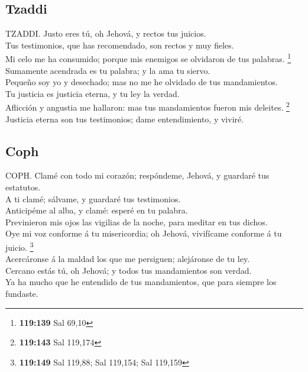 \hypertarget{tzaddi}{%
\subsection{Tzaddi}\label{tzaddi}}

 TZADDI. Justo eres tú, oh Jehová, y rectos tus
juicios.\\
 Tus testimonios, que has recomendado, son rectos y muy
fieles.\\
 Mi celo me ha consumido; porque mis enemigos se
olvidaron de tus palabras. \footnote{\textbf{119:139} Sal 69,10}\\
 Sumamente acendrada es tu palabra; y la ama tu
siervo.\\
 Pequeño soy yo y desechado; mas no me he olvidado de
tus mandamientos.\\
 Tu justicia es justicia eterna, y tu ley la verdad.\\
 Aflicción y angustia me hallaron: mas tus mandamientos
fueron mis deleites. \footnote{\textbf{119:143} Sal 119,174}\\
 Justicia eterna son tus testimonios; dame
entendimiento, y viviré.

\hypertarget{coph}{%
\subsection{Coph}\label{coph}}

 COPH. Clamé con todo mi corazón; respóndeme, Jehová, y
guardaré tus estatutos.\\
 A ti clamé; sálvame, y guardaré tus testimonios.\\
 Anticipéme al alba, y clamé: esperé en tu palabra.\\
 Previnieron mis ojos las vigilias de la noche, para
meditar en tus dichos.\\
 Oye mi voz conforme á tu misericordia; oh Jehová,
vivifícame conforme á tu juicio. \footnote{\textbf{119:149} Sal 119,88;
  Sal 119,154; Sal 119,159}\\
 Acercáronse á la maldad los que me persiguen;
alejáronse de tu ley.\\
 Cercano estás tú, oh Jehová; y todos tus mandamientos
son verdad.\\
 Ya ha mucho que he entendido de tus mandamientos, que
para siempre los fundaste.

